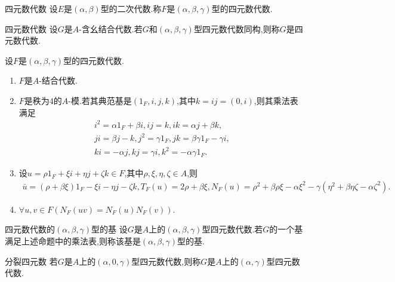 \begin{example}{四元数代数}{}
	设$E$是$\left(\alpha,\beta\right)$型的二次代数.称$F$是$\left(\alpha,\beta,\gamma\right)$型的四元数代数.
\end{example}

\begin{definition}{四元数代数}{}
	设$G$是$A$-含幺结合代数.若$G$和$\left(\alpha,\beta,\gamma\right)$型四元数代数同构,则称$G$是四元数代数.
\end{definition}

\begin{proposition}{}{}
	设$F$是$\left(\alpha,\beta,\gamma\right)$型的四元数代数.
	\begin{enumerate}
		\item $F$是$A$-结合代数.
		\item $F$是秩为$4$的$A$-模.若其典范基是$\left(1_{F},i,j,k\right)$,其中$k=ij=\left(0,i\right)$,则其乘法表满足
		\begin{gather*}
			i^{2}=\alpha 1_{F}+\beta i,ij=k,ik=\alpha j+\beta k,\\
			ji=\beta j-k,j^{2}=\gamma 1_{F},jk=\beta\gamma 1_{F}-\gamma i,\\
			ki=-\alpha j,kj=\gamma i,k^{2}=-\alpha\gamma 1_{F}.
		\end{gather*}
		\item 设$u=\rho 1_{F}+\xi i+\eta j+\zeta k\in F$,其中$\rho,\xi,\eta,\zeta\in A$,则
		\begin{align*}
			\bar{u}=\left(\rho+\beta\xi\right)1_{F}-\xi i-\eta j-\zeta k,T_{F}\left(u\right)=2\rho+\beta\xi,N_{F}\left(u\right)=\rho^{2}+\beta\rho\xi-\alpha\xi^{2}-\gamma\left(\eta^{2}+\beta\eta\zeta-\alpha\zeta^{2}\right).
		\end{align*}
		\item $\forall u,v\in F\left(N_{F}\left(uv\right)=N_{F}\left(u\right)N_{F}\left(v\right)\right)$.
	\end{enumerate}
\end{proposition}

\begin{definition}{四元数代数的$\left(\alpha,\beta,\gamma\right)$型的基}{}
	设$G$是$A$上的$\left(\alpha,\beta,\gamma\right)$型四元数代数.若$G$的一个基满足上述命题中的乘法表,则称该基是$\left(\alpha,\beta,\gamma\right)$型的基.
\end{definition}

\begin{definition}{分裂四元数}{}
	若$G$是$A$上的$\left(\alpha,0,\gamma\right)$型四元数代数,则称$G$是$A$上的$\left(\alpha,\gamma\right)$型四元数代数.
\end{definition}

